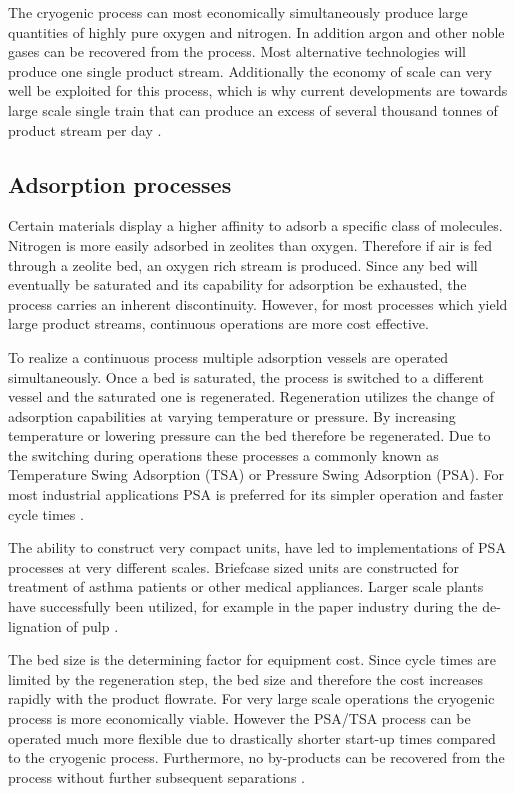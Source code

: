         The cryogenic process can most economically simultaneously produce large quantities of highly pure oxygen and nitrogen.
        In addition argon and other noble gases can be recovered from the process. Most alternative technologies will
        produce one single product stream. Additionally the economy of scale can very well be exploited for this
        process, which is why current developments are towards large scale single train that can produce
        an excess of several thousand tonnes of product stream per day \cite{Castle.2002}.

        \subsection{Adsorption processes}
        \label{sec:psa}
        Certain materials display a higher affinity to adsorb a specific class of molecules. Nitrogen is
        more easily adsorbed in zeolites than oxygen. Therefore if air is fed through a
        zeolite bed, an oxygen rich stream is produced. Since any bed will eventually
        be saturated and its capability for adsorption be exhausted, the process carries an
        inherent discontinuity. However, for most processes which yield large product streams,
        continuous operations are more cost effective.

        To realize a continuous process multiple adsorption vessels are operated simultaneously.
        Once a bed is saturated, the process is switched to a different vessel and the saturated one
        is regenerated. Regeneration utilizes the change of adsorption capabilities at varying temperature
        or pressure. By increasing temperature or lowering pressure can the bed therefore be regenerated.
        Due to the switching during operations these processes a commonly known as Temperature Swing Adsorption
        (TSA) or Pressure Swing Adsorption (PSA). For most industrial applications PSA is preferred for its
        simpler operation and faster cycle times \cite{Smith.2001}.

        The ability to construct very compact units, have led to implementations of PSA processes at
        very different scales. Briefcase sized units are constructed for treatment of asthma patients or other
        medical appliances. Larger scale plants have successfully been utilized, for example in the paper industry
        during the de-lignation of pulp \cite{Nelson.1993}.

        The bed size is the determining factor for equipment cost. Since cycle times are limited by the regeneration
        step, the bed size and therefore the cost increases rapidly with the product flowrate. For very large
        scale operations the cryogenic process is more economically viable. However the PSA/TSA process can be operated
        much more flexible due to drastically shorter start-up times compared to the cryogenic process. Furthermore, no
        by-products can be recovered from the process without further subsequent separations \cite{Choi.2003}.

